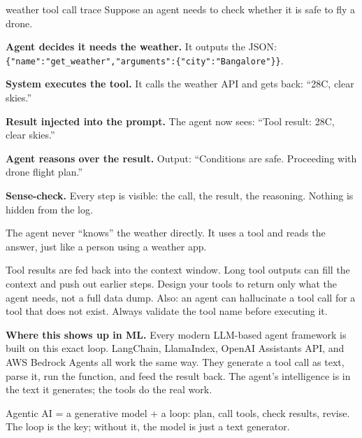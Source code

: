 \documentclass[a4paper,11pt]{article}
\begin{document}
\begin{worked}{weather tool call trace}
Suppose an agent needs to check whether it is safe to fly a drone.
\begin{steps}
  \item \textbf{Agent decides it needs the weather.}
        It outputs the JSON:
        \texttt{\{"name":"get\_weather","arguments":\{"city":"Bangalore"\}\}}.
  \item \textbf{System executes the tool.}
        It calls the weather API and gets back: ``28\textdegree C, clear skies.''
  \item \textbf{Result injected into the prompt.}
        The agent now sees: ``Tool result: 28\textdegree C, clear skies.''
  \item \textbf{Agent reasons over the result.}
        Output: ``Conditions are safe. Proceeding with drone flight plan.''
  \item \textbf{Sense-check.}
        Every step is visible: the call, the result, the reasoning.
        Nothing is hidden from the log.
\end{steps}
The agent never ``knows'' the weather directly. It uses a tool and reads the answer, just like a person using a weather app.
\end{worked}

\begin{watchout}
Tool results are fed back into the context window.
Long tool outputs can fill the context and push out earlier steps.
Design your tools to return only what the agent needs, not a full data dump.
Also: an agent can hallucinate a tool call for a tool that does not exist.
Always validate the tool name before executing it.
\end{watchout}

\textbf{Where this shows up in ML.}
Every modern LLM-based agent framework is built on this exact loop.
LangChain, LlamaIndex, OpenAI Assistants API, and AWS Bedrock Agents all work the same way.
They generate a tool call as text, parse it, run the function, and feed the result back.
The agent's intelligence is in the text it generates; the tools do the real work.

\begin{keytake}
Agentic AI = a generative model + a loop: plan, call tools, check results, revise.
The loop is the key; without it, the model is just a text generator.
\end{keytake}

\end{document}
